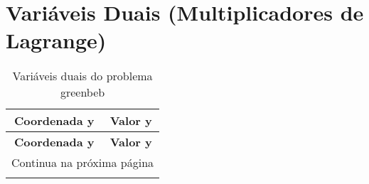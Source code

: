\documentclass[12pt]{article}
\begin{document}
\section{Variáveis Duais (Multiplicadores de Lagrange)}

\begin{longtable}{@{}cc@{}}
\caption{Variáveis duais do problema greenbeb} \\
\toprule
\textbf{Coordenada y} & \textbf{Valor y} \\
\midrule
\endfirsthead

\toprule
\textbf{Coordenada y} & \textbf{Valor y} \\
\midrule
\endhead

\midrule \multicolumn{2}{r}{{Continua na próxima página}} \\ \midrule
\endfoot


\end{longtable}
\end{document}
